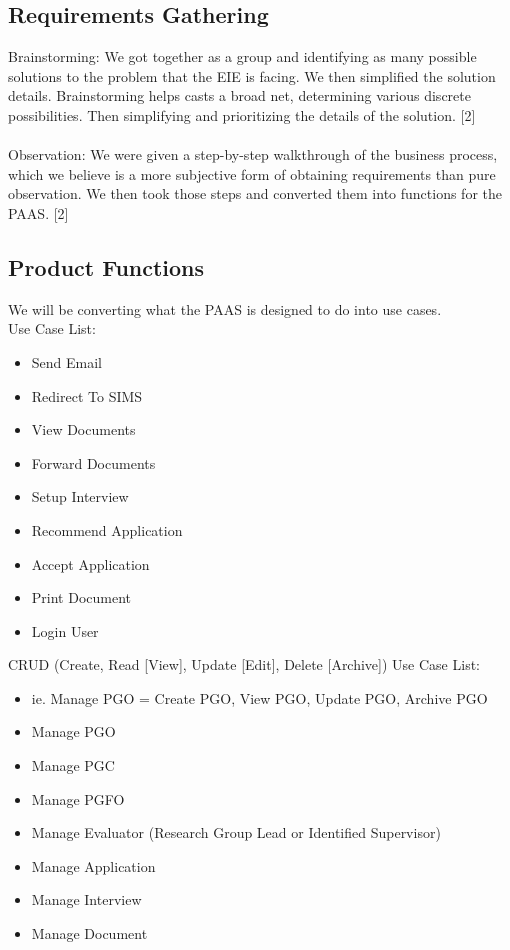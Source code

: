 \documentclass{article}
\begin{document}
\subsection{Requirements Gathering}
Brainstorming: We got together as a group and identifying as many possible solutions to the problem that the EIE is facing. We then simplified the solution details. Brainstorming helps casts a broad net, determining various discrete possibilities. Then simplifying and prioritizing the details of the solution. [2] \\ \\
Observation: We were given a step-by-step walkthrough of the business process, which we believe is a more subjective form of obtaining requirements than pure observation. We then took those steps and converted them into functions for the PAAS. [2]

\subsection{Product Functions}
We will be converting what the PAAS is designed to do into use cases. \\
Use Case List: 
\begin{itemize}
\item Send Email
\item Redirect To SIMS
\item View Documents
\item Forward Documents
\item Setup Interview
\item Recommend Application
\item Accept Application
\item Print Document
\item Login User \\
\end{itemize}
CRUD (Create, Read [View], Update [Edit], Delete [Archive]) Use Case List:
\begin{itemize}
\item ie. Manage PGO = Create PGO, View PGO, Update PGO, Archive PGO
\item Manage PGO 
\item Manage PGC
\item Manage PGFO
\item Manage Evaluator (Research Group Lead or Identified Supervisor)
\item Manage Application
\item Manage Interview
\item Manage Document
\end{itemize}
\end{document}
